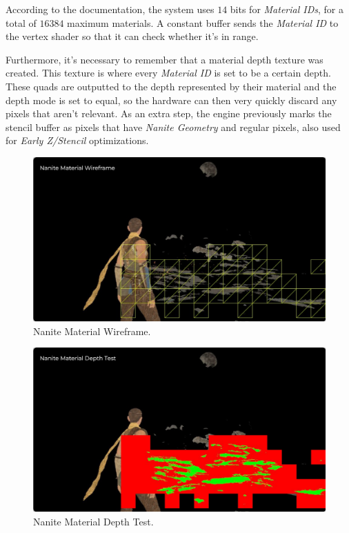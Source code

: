 \documentclass[10pt,journal,compsoc]{IEEEtran}
\begin{document}
\par According to the documentation, the system uses $14$ bits for \textit{Material IDs}, for a total of $16384$ maximum materials. A constant buffer sends the \textit{Material ID} to the vertex shader so that it can check whether it's in range.

\par Furthermore, it's necessary to remember that a material depth texture was created. This texture is where every \textit{Material ID} is set to be a certain depth. These quads are outputted to the depth represented by their material and the depth mode is set to equal, so the hardware can then very quickly discard any pixels that aren't relevant. As an extra step, the engine previously marks the stencil buffer as pixels that have \textit{Nanite Geometry} and regular pixels, also used for \textit{Early Z/Stencil} optimizations.

\begin{figure}[H]
    \centering
    \includegraphics[scale=0.22]{img/wireframe.png}
    \caption{Nanite Material Wireframe\cite{IGN}.}
    \label{fig:wire}
\end{figure}

\begin{figure}[H]
    \centering
    \includegraphics[scale=0.22]{img/Depth.png}
    \caption{Nanite Material Depth Test\cite{IGN}.}
    \label{fig:depth}
\end{figure}
\end{document}
